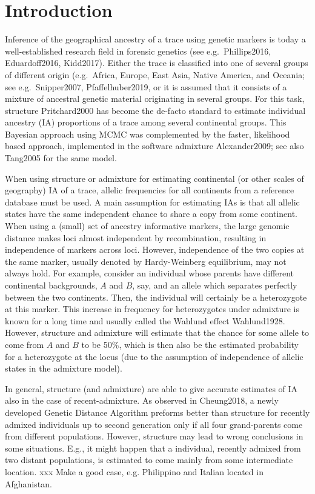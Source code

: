 \documentclass[12pt]{article}
\theoremstyle{definition}
\begin{document}
\section{Introduction}
Inference of the geographical ancestry of a trace using genetic
markers is today a well-established research field in forensic
genetics (see e.g.\ \cite{article}{Phillips2016, Eduardoff2016,
  Kidd2017}). Either the trace is classified into one of several
groups of different origin (e.g.\ Africa, Europe, East Asia, Native
America, and Oceania; see e.g.\ \cite{article}{Snipper2007, Pfaffelhuber2019},
or it is assumed that it consists of a mixture of ancestral genetic
material originating in several groups. For this task, {\sc structure}
\cite{article}{Pritchard2000} has become the de-facto standard to estimate
individual ancestry (IA) proportions of a trace among several
continental groups. This Bayesian approach using MCMC was complemented
by the faster, likelihood based approach, implemented in the software
{\sc admixture} \cite{article}{Alexander2009}; see also \cite{article}{Tang2005} for the
same model.

When using {\sc structure} or {\sc admixture} for estimating
continental (or other scales of geography) IA of a trace, allelic
frequencies for all continents from a reference database must be
used. A main assumption for estimating IAs is that all allelic states
have the same independent chance to share a copy from some continent.
When using a (small) set of ancestry informative markers, the large
genomic distance makes loci almost independent by recombination,
resulting in independence of markers across loci. However,
independence of the two copies at the same marker, usually denoted by
Hardy-Weinberg equilibrium, may not always hold. For example, consider
an individual whose parents have different continental backgrounds,
$A$ and $B$, say, and an allele which separates perfectly between the
two continents. Then, the individual will certainly be a heterozygote
at this marker. This increase in frequency for heterozygotes under
admixture is known for a long time and usually called the Wahlund
effect \cite{article}{Wahlund1928}.  However, {\sc structure} and {\sc
  admixture} will estimate that the chance for some allele to come
from $A$ and $B$ to be 50\%, which is then also be the estimated
probability for a heterozygote at the locus (due to the assumption of
independence of allelic states in the admixture model).

In general, {\sc structure} (and {\sc admixture}) are able to give
accurate estimates of IA also in the case of recent-admixture.  As
observed in \cite{article}{Cheung2018}, a newly developed Genetic Distance
Algorithm preforms better than {\sc structure} for recently admixed
individuals up to second generation only if all four grand-parents
come from different populations. However, {\sc structure} may lead to
wrong conclusions in some situations. E.g., it might happen that a
individual, recently admixed from two distant populations, is
estimated to come mainly from some intermediate location.
{\color{blue} xxx Make a good case, e.g. Philippino and Italian
  located in Afghanistan.}
\end{document}
